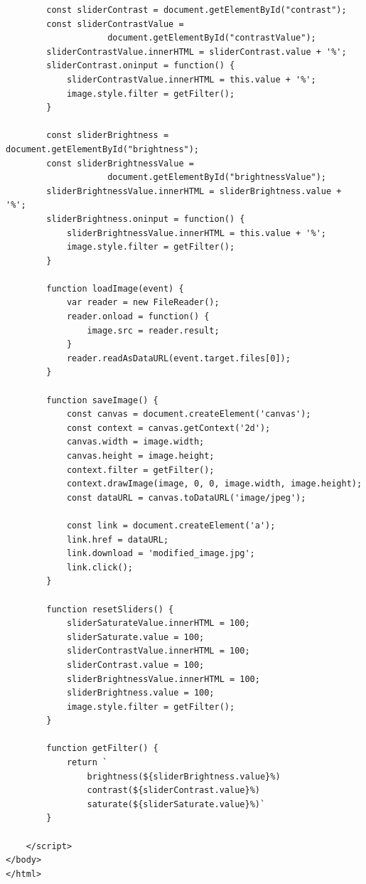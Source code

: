\documentclass[12pt,a4paper]{scrartcl}
\begin{document}
\begin{verbatim}
        const sliderContrast = document.getElementById("contrast");
        const sliderContrastValue = 
                    document.getElementById("contrastValue");
        sliderContrastValue.innerHTML = sliderContrast.value + '%';
        sliderContrast.oninput = function() {
            sliderContrastValue.innerHTML = this.value + '%';
            image.style.filter = getFilter();
        }

        const sliderBrightness = document.getElementById("brightness");
        const sliderBrightnessValue = 
                    document.getElementById("brightnessValue");
        sliderBrightnessValue.innerHTML = sliderBrightness.value + '%';
        sliderBrightness.oninput = function() {
            sliderBrightnessValue.innerHTML = this.value + '%';
            image.style.filter = getFilter();
        }

        function loadImage(event) {
            var reader = new FileReader();
            reader.onload = function() {
                image.src = reader.result;
            }
            reader.readAsDataURL(event.target.files[0]);
        }

        function saveImage() {    
            const canvas = document.createElement('canvas');
            const context = canvas.getContext('2d');
            canvas.width = image.width;
            canvas.height = image.height;
            context.filter = getFilter();
            context.drawImage(image, 0, 0, image.width, image.height);
            const dataURL = canvas.toDataURL('image/jpeg');

            const link = document.createElement('a');
            link.href = dataURL;
            link.download = 'modified_image.jpg';
            link.click();
        }

        function resetSliders() {
            sliderSaturateValue.innerHTML = 100;
            sliderSaturate.value = 100;
            sliderContrastValue.innerHTML = 100;
            sliderContrast.value = 100;
            sliderBrightnessValue.innerHTML = 100;
            sliderBrightness.value = 100;
            image.style.filter = getFilter();
        }

        function getFilter() {
            return `
                brightness(${sliderBrightness.value}%) 
                contrast(${sliderContrast.value}%) 
                saturate(${sliderSaturate.value}%)`
        }

    </script>
</body>
</html>
\end{verbatim}
\end{document}
